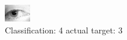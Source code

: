 \begin{figure}[h!]
\begin{center}
\includegraphics[width=0.60\columnwidth]{figures/ID1379_class_4_target_3.png}
\end{center}
\caption{ Classification: 4 actual target: 3}
\label{fig:ID1379_class_4_target_3}
\end{figure}
